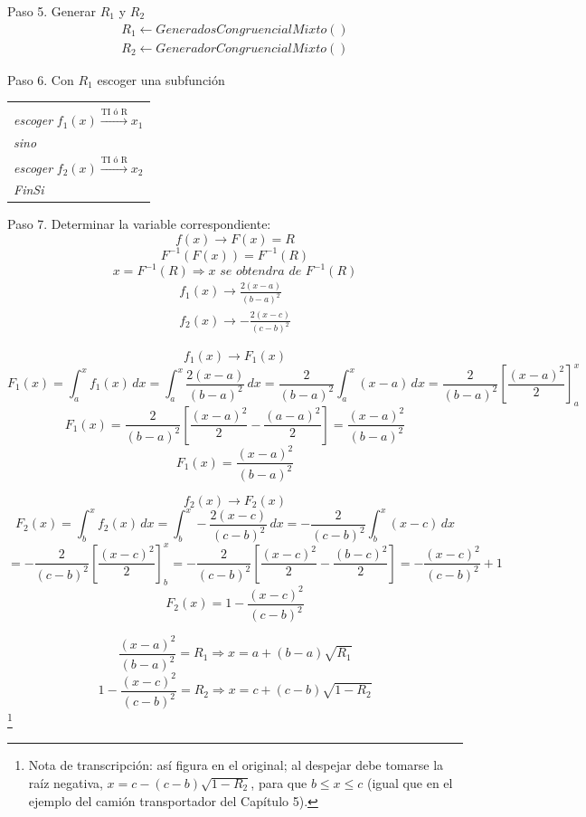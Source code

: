\documentclass[11pt,letterpaper]{report}
\newenvironment{algoritmo}
  {\begin{center}\begin{tabular}{|p{0.85\textwidth}|}\hline\vspace{-0.2cm}\begin{tabbing}\hspace{0.6cm}\=\hspace{0.6cm}\=\hspace{0.6cm}\=\hspace{0.6cm}\=\hspace{0.6cm}\=\kill}
  {\end{tabbing}\vspace{-0.4cm}\\\hline\end{tabular}\end{center}}
\begin{document}
\begin{center}
\end{center}

Paso 5. Generar $R_1$ y $R_2$
\begin{gather*}
R_1 \leftarrow GeneradosCongruencialMixto()\\
R_2 \leftarrow GeneradorCongruencialMixto()
\end{gather*}

Paso 6. Con $R_1$ escoger una subfunción

\begin{algoritmo}
\>\textit{Si} $\left(R_1 < \frac{b-a}{c-a}\right)$\\
\>\>\textit{escoger} $f_1(x) \xrightarrow{\text{TI ó R}} x_1$\\
\>\textit{sino}\\
\>\>\textit{escoger} $f_2(x) \xrightarrow{\text{TI ó R}} x_2$\\
\>\textit{FinSi}
\end{algoritmo}

Paso 7. Determinar la variable correspondiente:
\[
f(x) \longrightarrow F(x) = R
\]
\[
F^{-1}(F(x)) = F^{-1}(R)
\]
\[
x = F^{-1}(R) \Rightarrow x \textit{ se obtendra de } F^{-1}(R)
\]
\begin{gather*}
f_1(x) \longrightarrow \frac{2(x-a)}{(b-a)^2}\\
f_2(x) \longrightarrow -\frac{2(x-c)}{(c-b)^2}
\end{gather*}

\[
f_1(x) \longrightarrow F_1(x)
\]
\[
F_1(x) = \int_a^x f_1(x)\,dx = \int_a^x \frac{2(x-a)}{(b-a)^2}\,dx = \frac{2}{(b-a)^2}\int_a^x (x-a)\,dx = \frac{2}{(b-a)^2}\left[\frac{(x-a)^2}{2}\right]_a^x
\]
\[
F_1(x) = \frac{2}{(b-a)^2}\left[\frac{(x-a)^2}{2} - \frac{(a-a)^2}{2}\right] = \frac{(x-a)^2}{(b-a)^2}
\]
\[
F_1(x) = \frac{(x-a)^2}{(b-a)^2}
\]

\[
f_2(x) \longrightarrow F_2(x)
\]
\[
F_2(x) = \int_b^x f_2(x)\,dx = \int_b^x -\frac{2(x-c)}{(c-b)^2}\,dx = -\frac{2}{(c-b)^2}\int_b^x (x-c)\,dx
\]
\[
= -\frac{2}{(c-b)^2}\left[\frac{(x-c)^2}{2}\right]_b^x = -\frac{2}{(c-b)^2}\left[\frac{(x-c)^2}{2} - \frac{(b-c)^2}{2}\right] = -\frac{(x-c)^2}{(c-b)^2} + 1
\]
\[
F_2(x) = 1 - \frac{(x-c)^2}{(c-b)^2}
\]

\[
\frac{(x-a)^2}{(b-a)^2} = R_1 \Rightarrow x = a + (b-a)\sqrt{R_1}
\]
\[
1 - \frac{(x-c)^2}{(c-b)^2} = R_2 \Rightarrow x = c + (c-b)\sqrt{1 - R_2}
\]
\footnote{Nota de transcripción: así figura en el original; al despejar debe tomarse la raíz negativa, $x = c - (c-b)\sqrt{1 - R_2}$, para que $b \leq x \leq c$ (igual que en el ejemplo del camión transportador del Capítulo 5).}
\end{document}
